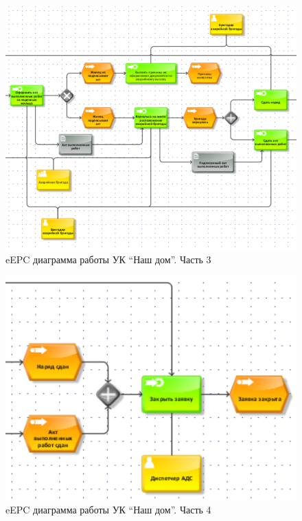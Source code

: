 \documentclass[a4paper,14pt]{extarticle}
\begin{document}
\begin{problem*}
	\begin{figure}[h!]
	\centering
	\includegraphics[width=0.7\linewidth]{images/pr-20/1.3}
	\caption{eEPC диаграмма работы УК “Наш дом”. Часть 3}
	\label{fig:1.3}
	\end{figure}
	
	\begin{figure}[h!]
	\centering
	\includegraphics[width=0.7\linewidth]{images/pr-20/1.4}
	\caption{eEPC диаграмма работы УК “Наш дом”. Часть 4}
	\label{fig:1.4}
	\end{figure}

\end{problem*}
\newpage\mbox{}\newpage
\end{document}
